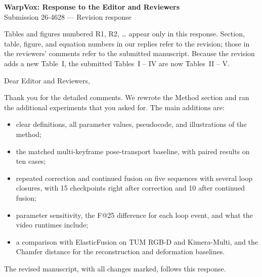 \documentclass[11pt,a4paper]{article}
\begin{document}
\begin{center}
{\Large\bfseries WarpVox: Response to the Editor and Reviewers}\\[5pt]
{Submission 26-4628 --- Revision response}
\end{center}
{\small Tables and figures numbered R1, R2, \dots{} appear only in this response. Section, table, figure, and equation numbers in our replies refer to the revision; those in the reviewers' comments refer to the submitted manuscript. Because the revision adds a new Table~I, the submitted Tables~I -- IV are now Tables~II -- V.}

Dear Editor and Reviewers,

Thank you for the detailed comments. We rewrote the Method section and ran the additional experiments that you asked for. The main additions are:
\begin{itemize}[nosep,leftmargin=*]
\item clear definitions, all parameter values, pseudocode, and illustrations of the method;
\item the matched multi-keyframe pose-transport baseline, with paired results on ten cases;
\item repeated correction and continued fusion on five sequences with several loop closures, with 15 checkpoints right after correction and 10 after continued fusion;
\item parameter sensitivity, the F@25 difference for each loop event, and what the video runtimes include;
\item a comparison with ElasticFusion on TUM RGB-D and Kimera-Multi, and the Chamfer distance for the reconstruction and deformation baselines.
\end{itemize}
The revised manuscript, with all changes marked, follows this response.
\end{document}
